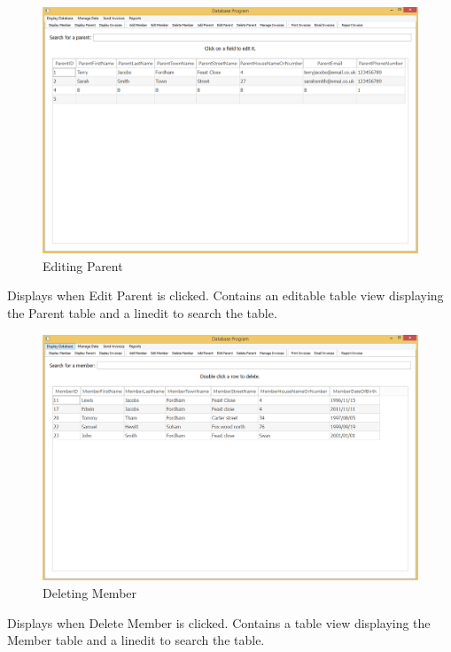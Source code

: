\begin{figure}[H]
\includegraphics[width=\textwidth]{./Maintenance/Images/EditParent.png}
    \caption{Editing Parent} \label{fig:edit_parent}
\end{figure}

Displays when Edit Parent is clicked. Contains an editable table view displaying the Parent table and a linedit to search the table.

\begin{figure}[H]
\includegraphics[width=\textwidth]{./Maintenance/Images/DeleteMember.png}
    \caption{Deleting Member} \label{fig:delete_member}
\end{figure}

Displays when Delete Member is clicked. Contains a table view displaying the Member table and a linedit to search the table.

